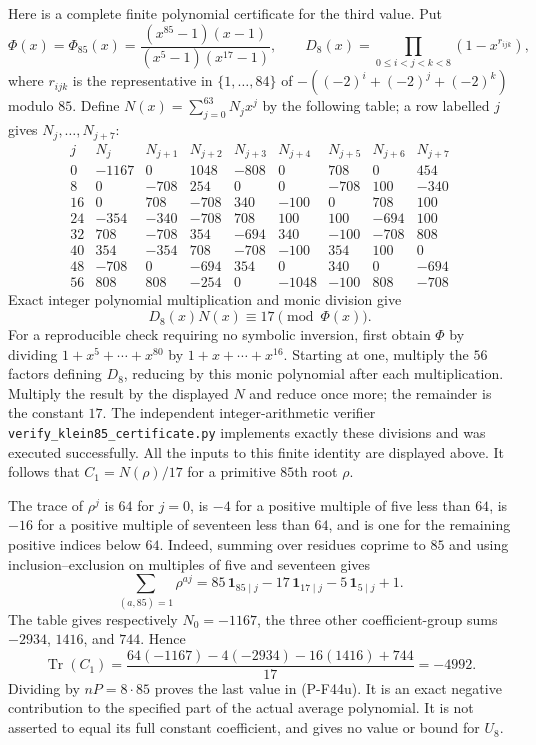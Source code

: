 Here is a complete finite polynomial certificate for the
third value. Put
\[
 \Phi(x)=\Phi_{85}(x)
       =\frac{(x^{85}-1)(x-1)}{(x^5-1)(x^{17}-1)},\qquad
 D_8(x)=\prod_{0\le i<j<k<8}(1-x^{r_{ijk}}),
\]
where $r_{ijk}$ is the representative in $\{1,\ldots,84\}$
of $-((-2)^i+(-2)^j+(-2)^k)$ modulo $85$.
Define $N(x)=\sum_{j=0}^{63}N_jx^j$ by the following
table; a row labelled $j$ gives $N_j,\ldots,N_{j+7}$:
\[
\begin{array}{r|rrrrrrrr}
 j&N_j&N_{j+1}&N_{j+2}&N_{j+3}&N_{j+4}&N_{j+5}&N_{j+6}&N_{j+7}\\\hline
 0&-1167&0&1048&-808&0&708&0&454\\
 8&0&-708&254&0&0&-708&100&-340\\
16&0&708&-708&340&-100&0&708&100\\
24&-354&-340&-708&708&100&100&-694&100\\
32&708&-708&354&-694&340&-100&-708&808\\
40&354&-354&708&-708&-100&354&100&0\\
48&-708&0&-694&354&0&340&0&-694\\
56&808&808&-254&0&-1048&-100&808&-708
\end{array}
\]
Exact integer polynomial multiplication and monic division give
\[
                         D_8(x)N(x)\equiv17\pmod{\Phi(x)}.
 \tag{P-F44v}
\]
For a reproducible check requiring no symbolic inversion,
first obtain $\Phi$ by dividing
$1+x^5+\cdots+x^{80}$ by $1+x+\cdots+x^{16}$.
Starting at one, multiply the $56$ factors defining $D_8$,
reducing by this monic polynomial after each multiplication.
Multiply the result by the displayed $N$ and reduce once
more; the remainder is the constant $17$.
The independent integer-arithmetic verifier
\texttt{verify\_klein85\_certificate.py} implements exactly
these divisions and was executed successfully.
All the inputs to this finite identity are displayed above.
It follows that $C_1=N(\rho)/17$ for a primitive
$85$th root $\rho$.

The trace of $\rho^j$ is $64$ for $j=0$, is $-4$ for a
positive multiple of five less than $64$, is $-16$ for
a positive multiple of seventeen less than $64$, and
is one for the remaining positive indices below $64$.
Indeed, summing over residues coprime to $85$ and using
inclusion--exclusion on multiples of five and seventeen
gives
\[
 \sum_{(a,85)=1}\rho^{aj}
   =85\,\mathbf1_{85\mid j}
          -17\,\mathbf1_{17\mid j}
          -5\,\mathbf1_{5\mid j}+1.
\]
The table gives respectively
$N_0=-1167$, the three other coefficient-group sums
$-2934$, $1416$, and $744$. Hence
\[
 \operatorname{Tr}(C_1)
  =\frac{64(-1167)-4(-2934)-16(1416)+744}{17}
  =-4992.
 \tag{P-F44w}
\]
Dividing by $nP=8\cdot85$ proves the last value in
(P-F44u).
It is an exact negative contribution to the specified
part of the actual average polynomial.
It is not asserted to equal its full constant coefficient,
and gives no value or bound for $U_8$.
